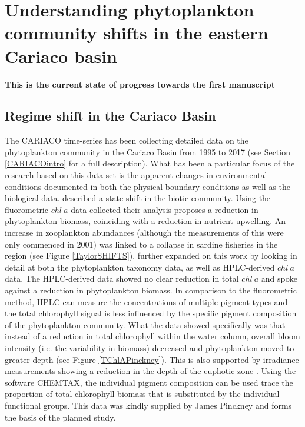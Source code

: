 \chapter{Understanding phytoplankton community shifts in the eastern Cariaco basin}

\small {\textbf{This is the current state of progress towards the first manuscript}}


\normalsize
\section{Regime shift in the Cariaco Basin}
The CARIACO time-series has been collecting detailed data on the phytoplankton community in the Cariaco Basin from 1995 to 2017 (see Section \ref{CARIACOintro} for a full description). 
What has been a particular focus of the research based on this data set is the apparent changes in environmental conditions documented in both the physical boundary conditions as well as the biological data. \citet{Taylor2012} described a state shift in the biotic community. 
Using the fluorometric $chl~a$ data collected their analysis proposes a reduction in phytoplankton biomass, coinciding with a reduction in nutrient upwelling. %
An increase in zooplankton abundances (although the measurements of this were only commenced in 2001) was linked to a collapse in sardine fisheries in the region (see Figure \ref{TaylorSHIFTS}). \citet{Pinckney2015} further expanded on this work by looking in detail at both the phytoplankton taxonomy data, as well as HPLC-derived $chl~a$ data. The HPLC-derived data showed no clear reduction in total $chl~a$ and spoke against a reduction in phytoplankton biomass. In comparison to the fluorometric method, HPLC can measure the concentrations of multiple pigment types and the total chlorophyll signal is less influenced by the specific pigment composition of the phytoplankton community. What the data showed specifically was that instead of a reduction in total chlorophyll within the water column, overall bloom intensity (i.e. the variability in biomass) decreased and phytoplankton moved to greater depth (see Figure \ref{TChlAPinckney}). This is also supported by irradiance measurements showing a reduction in the depth of the euphotic zone \citep{Pinckney2015}. Using the software CHEMTAX, the individual pigment composition can be used trace the proportion of total chlorophyll biomass that is substituted by the individual functional groups. 
This data was kindly supplied by James Pinckney and forms the basis of the planned study.

